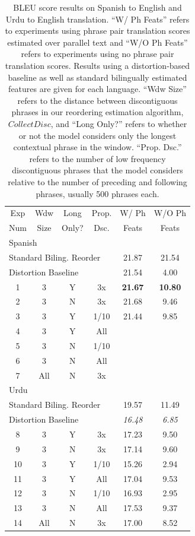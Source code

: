 \documentclass[11pt,letterpaper]{article}
\begin{document}
\begin{table}[t]
\begin{small}
\begin{center}
\begin{tabular}{|c|c|c|c|c|c|}
\hline
Exp & Wdw & Long & Prop.  & W/ Ph & W/O Ph \\
Num & Size & Only? &  Dsc. & Feats  & Feats \\
\hline
\multicolumn{6}{|l|}{Spanish} \\
\hline
\multicolumn{4}{|l|}{Standard Biling. Reorder} & 21.87 & 21.54 \\ 
\hline
\multicolumn{4}{|l|}{Distortion Baseline} & 21.54 & 4.00 \\ 
\hline
1 & 3 & Y & 3x & {\bf 21.67} & {\bf 10.80} \\
\hline
2 & 3 & N & 3x & 21.68 & 9.46 \\
3 & 3 & Y & 1/10 & 21.44 & 9.85 \\
4 & 3 & Y & All &  &  \\
5& 3 & N & 1/10 &  &  \\
6& 3 & N & All &  &  \\
7& All & N & 3x &  &  \\
\hline
\hline
\multicolumn{6}{|l|}{Urdu} \\
\hline
\multicolumn{4}{|l|}{Standard Biling. Reorder} & 19.57 & 11.49 \\ 
\hline
\multicolumn{4}{|l|}{Distortion Baseline} & {\it 16.48} & {\it 6.85} \\ %
\hline
8 & 3 & Y & 3x & 17.23 & 9.50 \\
\hline
9 & 3 & N & 3x & 17.14 & 9.60 \\
10 & 3 & Y & 1/10 & 15.26 & 2.94 \\
11 & 3 & Y & All & 17.04 & 9.53 \\
12 & 3 & N & 1/10 & 16.93 & 2.95 \\
13 & 3 & N & All & 17.53 & 9.37 \\
14 & All & N & 3x & 17.00 & 8.52 \\
\hline
\end{tabular}
\end{center}
\vskip -0.1in
\caption{\label{bleu-table}BLEU score results on Spanish to English and Urdu to English translation. ``W/ Ph Feats'' refers to experiments using phrase pair translation scores estimated over parallel text and ``W/O Ph Feats'' refers to experiments using no phrase pair translation scores. Results using a distortion-based baseline as well as standard bilingually estimated features are given for each language. ``Wdw Size'' refers to the distance between discontiguous phrases in our reordering estimation algorithm, $CollectDisc$, and ``Long Only?'' refers to whether or not the model considers only the longest contextual phrase in the window. ``Prop. Dsc.'' refers to the number of low frequency discontiguous phrases that the model considers relative to the number of preceding and following phrases, usually 500 phrases each.}
\vskip -0.15in
\end{small}
\end{table}
\end{document}
